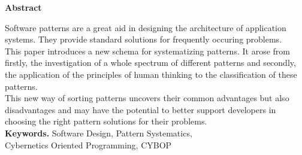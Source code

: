 %
%
%
%
%
%
%

\begin{center}
    \textbf{\large{Abstract}}
\end{center}
Software patterns are a great aid in designing the architecture of application
systems. They provide standard solutions for frequently occuring problems.\\
This paper introduces a new schema for systematizing patterns. It arose from
firstly, the investigation of a whole spectrum of different patterns and
secondly, the application of the principles of human thinking to the
classification of these patterns.\\
This new way of sorting patterns uncovers their common advantages but also
disadvantages and may have the potential to better support developers in
choosing the right pattern solutions for their problems.\\
\textbf{Keywords.} Software Design, Pattern Systematics,\\
Cybernetics Oriented Programming, CYBOP
